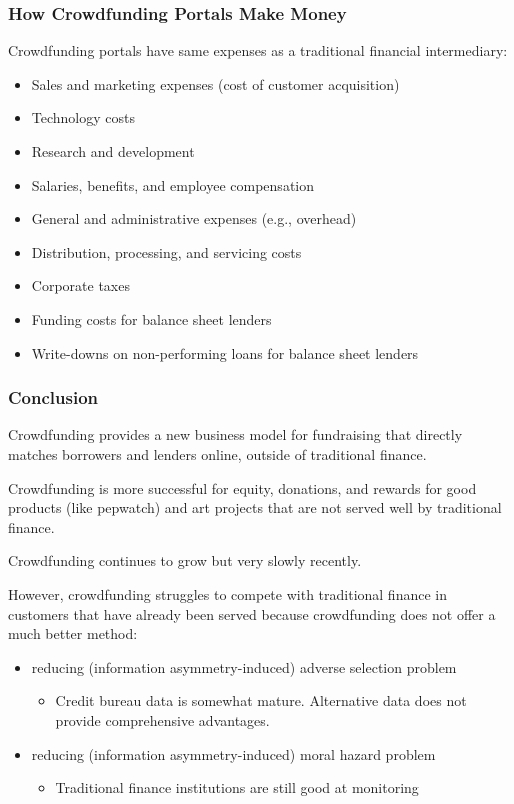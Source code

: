 \begin{frame}
\frametitle{How Crowdfunding Portals Make Money}


Crowdfunding portals have same expenses as a traditional financial intermediary:
\begin{itemize}
    \item Sales and marketing expenses (cost of customer acquisition)
    \item Technology costs
    \item Research and development
    \item Salaries, benefits, and employee compensation
    \item General and administrative expenses (e.g., overhead)
    \item Distribution, processing, and servicing costs
    \item Corporate taxes
    \item Funding costs for balance sheet lenders
    \item Write-downs on non-performing loans for balance sheet lenders
\end{itemize}



\end{frame} 


\begin{frame}
\frametitle{Conclusion}


Crowdfunding provides a new business model for fundraising that directly matches borrowers and lenders online, outside of traditional finance.

\medskip 

Crowdfunding is more successful for equity, donations, and rewards for good products (like pepwatch) and art projects that are not served well by traditional finance. 

\medskip 

Crowdfunding continues to grow but very slowly recently. 

\medskip 

However, crowdfunding struggles to compete with traditional finance in customers that have already been served because crowdfunding does not offer a much better method: 
\begin{itemize}
    \item reducing (information asymmetry-induced) adverse selection problem
    \begin{itemize}
        \item Credit bureau data is somewhat mature. Alternative data does not provide comprehensive advantages. 
    \end{itemize}
    \item reducing (information asymmetry-induced) moral hazard problem
    \begin{itemize}
        \item Traditional finance institutions are still good at monitoring
    \end{itemize}
\end{itemize}




\end{frame} 
